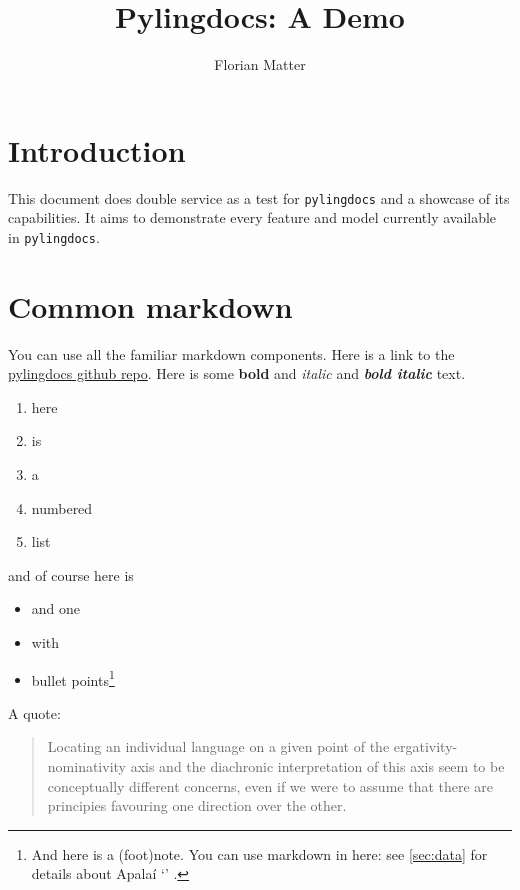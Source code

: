 \documentclass{memoir}
\title{Pylingdocs: A Demo}
\author{Florian Matter}
\begin{document}


\tableofcontents

\chapter{\texorpdfstring{Introduction \label{sec:intro}}{Introduction }}

This document does double service as a test for \texttt{pylingdocs} and
a showcase of its capabilities. It aims to demonstrate every feature and
model currently available in \texttt{pylingdocs}.

\chapter{\texorpdfstring{Common
markdown\label{common-markdown}}{Common markdown}}

You can use all the familiar markdown components. Here is a link to the
\href{https://github.com/fmatter/pylingdocs/}{pylingdocs github repo}.
Here is some \textbf{bold} and \emph{italic} and \textbf{\emph{bold
italic}} text.

\begin{enumerate}
\def\labelenumi{\arabic{enumi}.}
\tightlist
\item
  here
\item
  is
\item
  a
\item
  numbered
\item
  list
\end{enumerate}

and of course here is

\begin{itemize}
\tightlist
\item
  and one
\item
  with
\item
  bullet points\footnote{And here is a (foot)note. You can use markdown
    in here: see \cref{sec:data} for details about Apalaí 
    `' \parencites[77]{koehn1986apalai}.}
\end{itemize}

A quote:

\begin{quote}
Locating an individual language on a given point of the
ergativity-nominativity axis and the diachronic interpretation of this
axis seem to be conceptually different concerns, even if we were to
assume that there are principies favouring one direction over the other.
\parencites[71]{alvarez1998split}
\end{quote}
\end{document}
